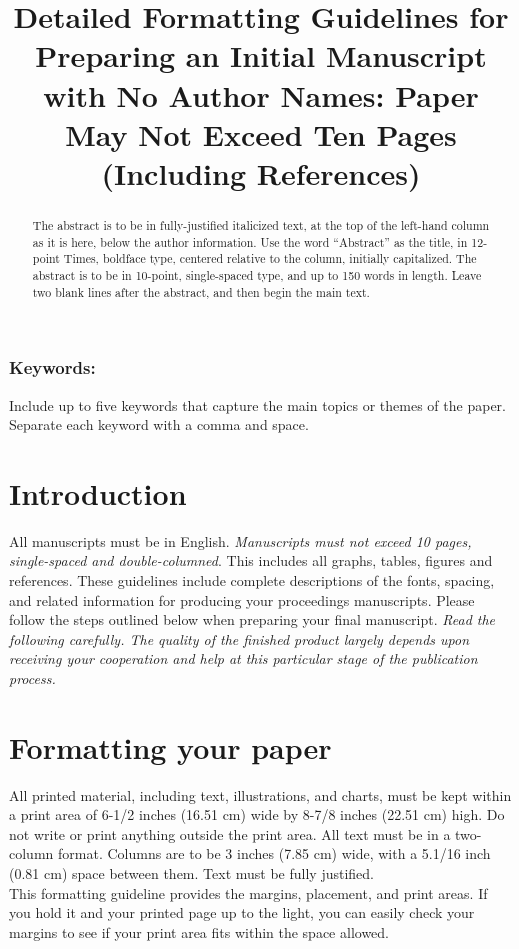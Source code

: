 \documentclass[10pt]{article}
\title{Detailed Formatting Guidelines for Preparing an Initial Manuscript with No Author Names: Paper May Not Exceed Ten Pages (Including References)}
\date{}
\begin{document}
\maketitle
\begin{abstract}
The abstract is to be in fully-justified italicized text, at the top of the left-hand column as it is here, below the author information. Use the word “Abstract” as the title, in 12-point Times, boldface type, centered relative to the column, initially capitalized. The abstract is to be in 10-point, single-spaced type, and up to 150 words in length. Leave two blank lines after the abstract, and then begin the main text. 
\end{abstract}

\subsubsection*{Keywords:}

Include up to five keywords that capture the main topics or themes of the paper. Separate each keyword with a comma and space.

\section{Introduction}

All manuscripts must be in English. {\em Manuscripts must not exceed 10 pages, single-spaced and double-columned}.  This includes all graphs, tables, figures and references. These guidelines include complete descriptions of the fonts, spacing, and related information for producing your proceedings manuscripts. Please follow the steps outlined below when preparing your final manuscript. {\em Read the following carefully. The quality of the finished product largely depends upon receiving your cooperation and help at this particular stage of the publication process.}


\section{Formatting your paper}

All printed material, including text, illustrations, and charts, must be kept within a print area of 6-1/2 inches (16.51 cm) wide by 8-7/8 inches (22.51 cm) high. Do not write or print anything outside the print area. All text must be in a two-column format. Columns are to be 3 inches (7.85 cm) wide, with a 5.1/16 inch (0.81 cm) space between them. Text must be fully justified. \\
This formatting guideline provides the margins, placement, and print areas. If you hold it and your printed page up to the light, you can easily check your margins to see if your print area fits within the space allowed.
\end{document}
